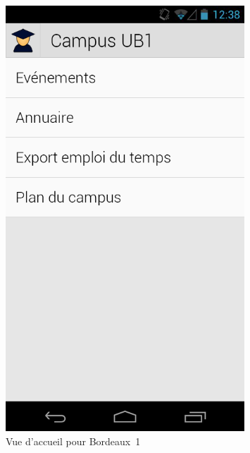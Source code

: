 \documentclass [pdftex,12pt] {report}
\begin{document}
\begin{figure}
\begin{minipage}[t]{8cm}
    \includegraphics[width=0.8\textwidth]{resources/ui_preview/02}
    \caption{Vue d'accueil pour Bordeaux~1}
    \label{fig:02}
  \end{minipage}
  \hspace{-60pt}
\end{figure}
\end{document}
